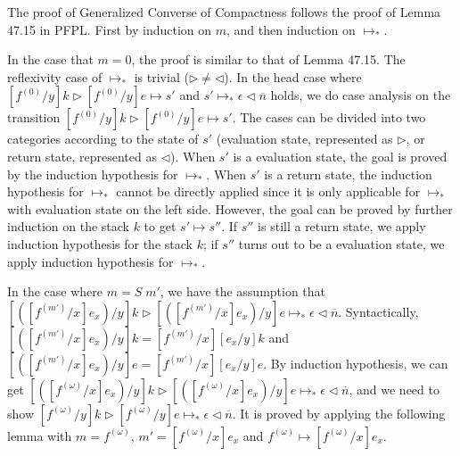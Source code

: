 \documentclass{article}
\newtheorem{lemma}{Lemma}
\begin{document}

The proof of Generalized Converse of Compactness follows the proof of Lemma 47.15 in PFPL.
First by induction on $m$, and then induction on $\longmapsto_*$.

In the case that $m = 0$, the proof is similar to that of Lemma 47.15.
The reflexivity case of $\longmapsto_*$ is trivial ($\triangleright\neq \triangleleft$).
In the head case where $[f^{(0)}/y]k\triangleright[f^{(0)}/y]e\longmapsto s'$
and $s' \longmapsto_* \epsilon\triangleleft\overline{n}$ holds, we do case analysis on
the transition $[f^{(0)}/y]k\triangleright[f^{(0)}/y]e\longmapsto s'$.
The cases can be divided into two categories
according to the state of $s'$ (evaluation state, represented as $\triangleright$, or return state, represented as $\triangleleft$).
When $s'$ is a evaluation state, the goal is proved by the induction hypothesis for $\longmapsto_*$.
When $s'$ is a return state, the induction hypothesis for $\longmapsto_*$ cannot be directly applied
since it is only applicable for $\longmapsto_*$ with evaluation state on the left side.
However, the goal can be proved by further induction on the stack $k$ to get $s'\longmapsto s''$.
If $s''$ is still a return state, we apply induction hypothesis for the stack $k$;
if $s''$ turns out to be a evaluation state, we apply induction hypothesis for $\longmapsto_*$.

In the case where $m = S\;m'$,
we have the assumption that
$[([f^{(m')}/x]e_x)/y]k\triangleright[([f^{(m')}/x]e_x)/y]e\longmapsto_*\epsilon\triangleleft\overline{n}$.
Syntactically, $[([f^{(m')}/x]e_x)/y]k = [f^{(m')}/x][e_x/y]k$ and $[([f^{(m')}/x]e_x)/y]e = [f^{(m')}/x][e_x/y]e$.
By induction hypothesis, we can get
$[([f^{(\omega)}/x]e_x)/y]k\triangleright[([f^{(\omega)}/x]e_x)/y]e\longmapsto_*\epsilon\triangleleft\overline{n}$,
and we need to show $[f^{(\omega)}/y]k\triangleright[f^{(\omega)}/y]e\longmapsto_*\epsilon\triangleleft\overline{n}$.
%
It is proved by applying the following lemma with $m = f^{(\omega)}$, $m' = [f^{(\omega)}/x]e_x$ and $f^{(\omega)}\longmapsto[f^{(\omega)}/x]e_x$.
\end{document}
